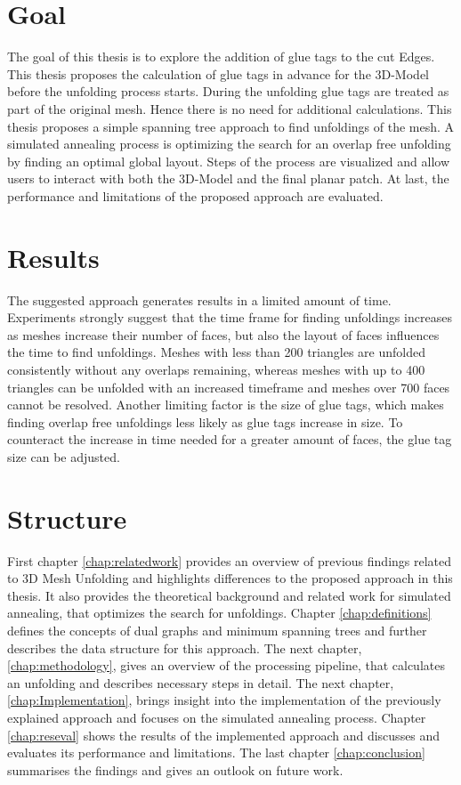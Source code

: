 \documentclass[draft,final]{vutinfth} %
\begin{document}
\section{Goal}
The goal of this thesis is to explore the addition of glue tags to the cut Edges. This thesis proposes the calculation of glue tags in advance for the 3D-Model before the unfolding process starts. During the unfolding glue tags are treated as part of the original mesh. Hence there is no need for additional calculations. This thesis proposes a simple spanning tree approach to find unfoldings of the mesh. A simulated annealing process is optimizing the search for an overlap free unfolding by finding an optimal global layout. Steps of the process are visualized and allow users to interact with both the 3D-Model and the final planar patch. At last, the performance and limitations of the proposed approach are evaluated.

\section{Results}
The suggested approach generates results in a limited amount of time. Experiments strongly suggest that the time frame for finding unfoldings increases as meshes increase their number of faces, but also the layout of faces influences the time to find unfoldings. Meshes with less than 200 triangles are unfolded consistently without any overlaps remaining, whereas meshes with up to 400 triangles can be unfolded with an increased timeframe and meshes over 700 faces cannot be resolved. Another limiting factor is the size of glue tags, which makes finding overlap free unfoldings less likely as glue tags increase in size. To counteract the increase in time needed for a greater amount of faces, the glue tag size can be adjusted.

\section{Structure}
First chapter \ref{chap:relatedwork} provides an overview of previous findings related to 3D Mesh Unfolding and highlights differences to the proposed approach in this thesis. It also provides the theoretical background and related work for simulated annealing, that optimizes the search for unfoldings. Chapter \ref{chap:definitions} defines the concepts of dual graphs and minimum spanning trees and further describes the data structure for this approach. The next chapter, \ref{chap:methodology}, gives an overview of the processing pipeline, that calculates an unfolding and describes necessary steps in detail. The next chapter, \ref{chap:Implementation}, brings insight into the implementation of the previously explained approach and focuses on the simulated annealing process. Chapter \ref{chap:reseval} shows the results of the implemented approach and discusses and evaluates its performance and limitations. The last chapter \ref{chap:conclusion} summarises the findings and gives an outlook on future work.
\end{document}
